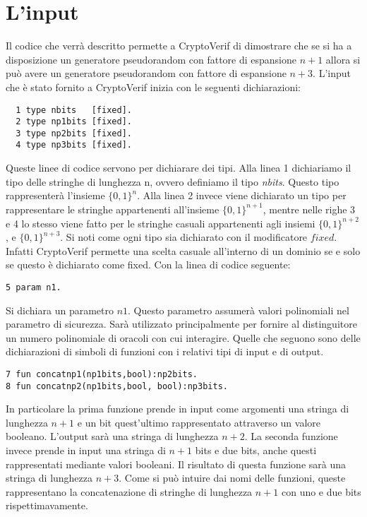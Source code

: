 \documentclass[a4paper,openright,twoside,12pt]{report}
\begin{document}
\section{L'input}
Il codice che verr\`a descritto permette a CryptoVerif di dimostrare che se si ha a disposizione un generatore pseudorandom con fattore
di espansione $n+1$ allora si pu\`o avere un generatore pseudorandom con fattore di espansione $n+3$.
L'input che \`e stato fornito a CryptoVerif inizia con le seguenti dichiarazioni:
\begin{verbatim}
  1 type nbits 	 [fixed].     
  2 type np1bits [fixed].   
  3 type np2bits [fixed].   
  4 type np3bits [fixed]. 
\end{verbatim}
Queste linee di codice servono per dichiarare dei tipi. Alla linea 1 dichiariamo il tipo delle stringhe di lunghezza n, ovvero
definiamo il tipo \emph{nbits}. Questo tipo rappresenter\`a l'insieme $\{0, 1\}^n$. Alla linea 2 invece viene dichiarato un tipo
per rappresentare le stringhe appartenenti all'insieme $\{0, 1\}^{n+1}$, mentre nelle righe 3 e 4 lo stesso viene fatto per le stringhe
casuali appartenenti agli insiemi $\{0, 1\}^{n+2}$, e $\{0, 1\}^{n+3}$. Si noti come ogni tipo sia dichiarato con il modificatore $fixed$.
Infatti CryptoVerif permette una scelta casuale all'interno di un dominio se e solo se questo \`e dichiarato come fixed.
Con la linea di codice seguente:
\begin{verbatim}
5 param n1.
\end{verbatim}
Si dichiara un parametro $n1$. Questo parametro assumer\`a valori polinomiali nel parametro di sicurezza. 
Sar\`a utilizzato principalmente per fornire al distinguitore un numero polinomiale di oracoli con cui interagire.
Quelle che seguono sono delle dichiarazioni di simboli di funzioni con i relativi tipi di input e di output.
\begin{verbatim}  
7 fun concatnp1(np1bits,bool):np2bits.
8 fun concatnp2(np1bits,bool, bool):np3bits.
\end{verbatim}
In particolare la prima funzione prende in input come argomenti una stringa di lunghezza $n+1$ e un bit quest'ultimo rappresentato attraverso
un valore booleano. L'output sar\`a una stringa di lunghezza $n+2$.
La seconda funzione invece prende in input una stringa di $n+1$ bits e due bits, anche questi rappresentati mediante valori booleani.
Il risultato di questa funzione sar\`a una stringa di lunghezza $n+3$. Come si pu\`o intuire dai nomi delle funzioni, queste rappresentano
la concatenazione di stringhe di lunghezza $n+1$ con uno e due bits rispettimavamente.
\end{document}
